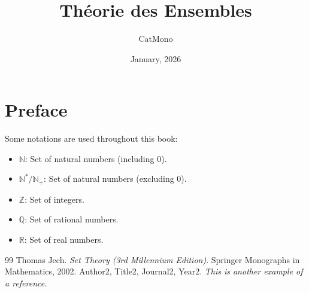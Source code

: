 \documentclass[11pt]{../../TexTemplate/elegantbook} %
\title{Théorie des Ensembles} %
\author{CatMono} %
\date{January, 2026} %
\begin{document}
\maketitle %

\frontmatter        %
\tableofcontents    %

\chapter{Preface}   %
Some notations are used throughout this book:
\begin{itemize}
    \item \(\mathbb{N}\): Set of natural numbers (including 0).
    \item \(\mathbb{N}^* / \mathbb{N}_{+}\): Set of natural numbers (excluding 0).
    \item \(\mathbb{Z}\): Set of integers.
    \item \(\mathbb{Q}\): Set of rational numbers.
    \item \(\mathbb{R}\): Set of real numbers.
\end{itemize}

\mainmatter         %





\begin{thebibliography}{99} 
 Thomas Jech. \emph{Set Theory (3rd Millennium Edition)}. Springer Monographs in Mathematics, 2002.
 Author2, Title2, Journal2, Year2. \emph{ This is another example of a reference.}
\end{thebibliography}
\end{document}
